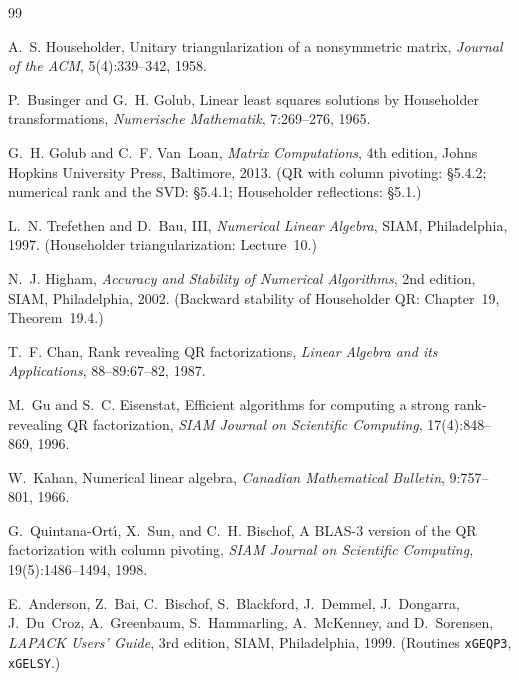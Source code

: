 \documentclass[11pt,a4paper]{article}
\theoremstyle{definition}
\begin{document}
\begin{thebibliography}{99}

A.~S. Householder,
\newblock Unitary triangularization of a nonsymmetric matrix,
\newblock \emph{Journal of the ACM}, 5(4):339--342, 1958.

P.~Businger and G.~H. Golub,
\newblock Linear least squares solutions by {H}ouseholder
transformations,
\newblock \emph{Numerische Mathematik}, 7:269--276, 1965.

G.~H. Golub and C.~F. Van~Loan,
\newblock \emph{Matrix Computations},
\newblock 4th edition, Johns Hopkins University Press, Baltimore,
2013. (QR with column pivoting: \S5.4.2; numerical rank and the SVD:
\S5.4.1; Householder reflections: \S5.1.)

L.~N. Trefethen and D.~Bau, III,
\newblock \emph{Numerical Linear Algebra},
\newblock SIAM, Philadelphia, 1997. (Householder triangularization:
Lecture~10.)

N.~J. Higham,
\newblock \emph{Accuracy and Stability of Numerical Algorithms},
\newblock 2nd edition, SIAM, Philadelphia, 2002. (Backward stability
of Householder QR: Chapter~19, Theorem~19.4.)

T.~F. Chan,
\newblock Rank revealing {QR} factorizations,
\newblock \emph{Linear Algebra and its Applications},
88--89:67--82, 1987.

M.~Gu and S.~C. Eisenstat,
\newblock Efficient algorithms for computing a strong rank-revealing
{QR} factorization,
\newblock \emph{SIAM Journal on Scientific Computing},
17(4):848--869, 1996.

W.~Kahan,
\newblock Numerical linear algebra,
\newblock \emph{Canadian Mathematical Bulletin}, 9:757--801, 1966.

G.~Quintana-Ort\'{\i}, X.~Sun, and C.~H. Bischof,
\newblock A {BLAS}-3 version of the {QR} factorization with column
pivoting,
\newblock \emph{SIAM Journal on Scientific Computing},
19(5):1486--1494, 1998.

E.~Anderson, Z.~Bai, C.~Bischof, S.~Blackford, J.~Demmel, J.~Dongarra,
J.~Du~Croz, A.~Greenbaum, S.~Hammarling, A.~McKenney, and D.~Sorensen,
\newblock \emph{{LAPACK} Users' Guide},
\newblock 3rd edition, SIAM, Philadelphia, 1999. (Routines
\texttt{xGEQP3}, \texttt{xGELSY}.)


\end{thebibliography}
\end{document}
